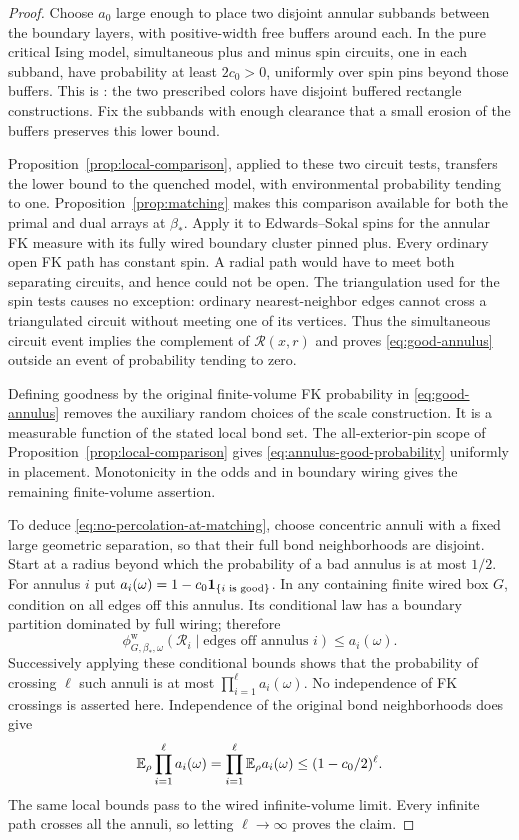 \begin{proof}
Choose $a_0$ large enough to place two disjoint annular subbands
between the boundary layers, with positive-width free buffers around
each. In the pure critical Ising model, simultaneous plus and minus
spin circuits, one in each subband, have probability at least
$2c_0>0$, uniformly over spin pins beyond those buffers. This is
\cite[Section~2, Proposition ``Pure buffered RSW consequences'']{S}:
the two prescribed colors have disjoint buffered rectangle
constructions. Fix the subbands with enough clearance that a small
erosion of the buffers preserves this lower bound.

Proposition~\ref{prop:local-comparison}, applied to these two circuit
tests, transfers the lower bound to the quenched model, with
environmental probability tending to one. Proposition~\ref{prop:matching}
makes this comparison available for both the primal and dual arrays
at $\beta_*$. Apply it to Edwards--Sokal spins for the annular FK
measure with its fully wired boundary cluster pinned plus. Every
ordinary open FK path has constant spin. A radial path would have
to meet both separating circuits, and hence could not be open.
The triangulation used for the spin tests causes no exception:
ordinary nearest-neighbor edges cannot cross a triangulated circuit
without meeting one of its vertices. Thus the simultaneous circuit
event implies the complement of $\mathcal R(x,r)$ and proves
\eqref{eq:good-annulus} outside an event of probability tending to
zero.

Defining goodness by the original finite-volume FK probability in
\eqref{eq:good-annulus} removes the auxiliary random choices of the
scale construction. It is a measurable function of the stated local
bond set. The all-exterior-pin scope of
Proposition~\ref{prop:local-comparison} gives
\eqref{eq:annulus-good-probability} uniformly in placement.
Monotonicity in the odds and in boundary wiring gives the remaining
finite-volume assertion.

To deduce \eqref{eq:no-percolation-at-matching}, choose concentric
annuli with a fixed large geometric separation, so that their full
bond neighborhoods are disjoint. Start at a radius beyond which
the probability of a bad annulus is at most $1/2$. For annulus $i$
put $a_i(\omega)=1-c_0\mathbf 1_{\{i\text{ is good}\}}$. In any containing
finite wired box $G$, condition on all edges off this annulus. Its
conditional law has a boundary partition dominated by full wiring;
therefore
\[
 \phi_{G,\beta_*,\omega}^{\mathrm w}
       (\mathcal R_i\mid\text{edges off annulus }i)
                \le a_i(\omega).
\]
Successively applying these conditional bounds shows that the
probability of crossing $\ell$ such annuli is at most
$\prod_{i=1}^{\ell}a_i(\omega)$. No independence of FK crossings
is asserted here. Independence of the original bond neighborhoods
does give
\[
 \mathbb E_\rho\prod_{i=1}^{\ell}a_i(\omega)
       =\prod_{i=1}^{\ell}\mathbb E_\rho a_i(\omega)
       \le(1-c_0/2)^\ell.
\]
The same local bounds pass to the wired infinite-volume limit.
Every infinite path crosses all the annuli, so letting
$\ell\to\infty$ proves the claim.
\end{proof}

